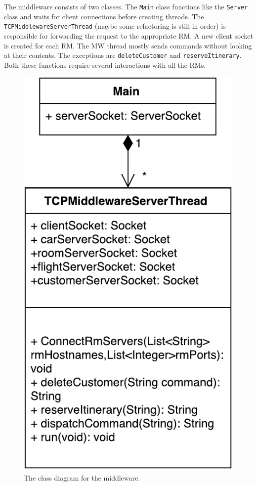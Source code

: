 \documentclass{article}
\begin{document}
The middleware consists of two classes. The \texttt{Main} class functions like the \texttt{Server} class and waits for client connections before creating threads.
The \texttt{TCPMiddlewareServerThread} (maybe some refactoring is still in order) is responsible for forwarding the request to the appropriate RM. A new client socket is created for each RM. The MW thread mostly sends commands without looking at their contents. The exceptions are \texttt{deleteCustomer} and \texttt{reserveItinerary}. Both these functions require several interactions with all the RMs.

\begin{figure}[h]
\centering
\includegraphics[scale=0.6]{figures/middleware-class.pdf}
\caption{The class diagram for the middleware.}
\label{f:server-class}
\end{figure}
\end{document}
